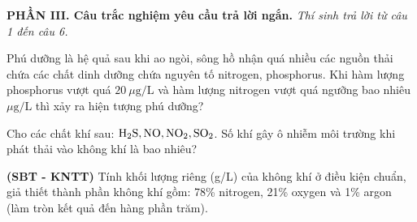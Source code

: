 \documentclass[12pt,a4paper]{article}
\begin{document}
\vspace{0.3cm}
\noindent\textbf{\large PHẦN III. Câu trắc nghiệm yêu cầu trả lời ngắn.}
\textit{Thí sinh trả lời từ câu 1 đến câu 6.}
\vspace{0.2cm}

\begin{ex}
Phú dưỡng là hệ quả sau khi ao ngòi, sông hồ nhận quá nhiều các nguồn thải chứa các chất dinh dưỡng chứa nguyên tố nitrogen, phosphorus. Khi hàm lượng phosphorus vượt quá $20\ \mu\text{g/L}$ và hàm lượng nitrogen vượt quá ngưỡng bao nhiêu $\mu\text{g/L}$ thì xảy ra hiện tượng phú dưỡng?

\end{ex}

\begin{ex}
Cho các chất khí sau: $\ce{H2S, NO, NO2, SO2}$. Số khí gây ô nhiễm môi trường khi phát thải vào không khí là bao nhiêu?

\end{ex}

\begin{ex}
\textbf{(SBT - KNTT)} Tính khối lượng riêng (g/L) của không khí ở điều kiện chuẩn, giả thiết thành phần không khí gồm: 78\% nitrogen, 21\% oxygen và 1\% argon (làm tròn kết quả đến hàng phần trăm).

\end{ex}
\end{document}
